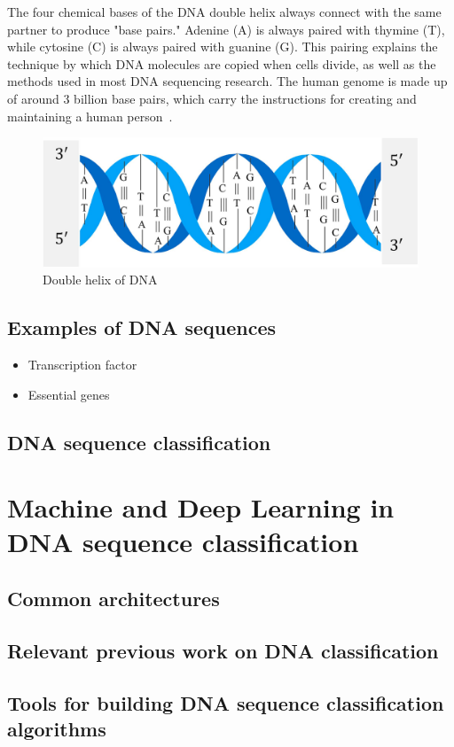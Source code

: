 The four chemical bases of the DNA double helix always connect with the same partner to produce "base pairs." Adenine (A) is always paired with thymine (T), while cytosine (C) is always paired with guanine (G). This pairing explains the technique by which DNA molecules are copied when cells divide, as well as the methods used in most DNA sequencing research. The human genome is made up of around 3 billion base pairs, which carry the instructions for creating and maintaining a human person~\cite{2020DNASheet}.

\begin{figure}[htbp]
    \centering
    \includegraphics[width=0.5\linewidth]{Chapters/Figures/dna.jpg}
    \caption{Double helix of DNA~\cite{Yang2020ReviewDNA}}
    \label{fig:dna}
\end{figure}

\subsection{Examples of DNA sequences}

\begin{itemize}
    \item Transcription factor
    \item Essential genes
\end{itemize}

\subsection{DNA sequence classification}

\section{Machine and Deep Learning in DNA sequence classification} \label{sec:ml_dl_dna}

\subsection{Common architectures}

\subsection{Relevant previous work on DNA classification}

\subsection{Tools for building DNA sequence classification algorithms}

